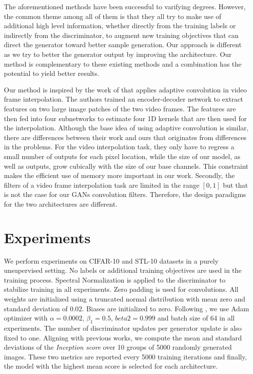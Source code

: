\documentclass{article} %
\begin{document}
The aforementioned methods have been successful to varifying degrees. However, the common theme among all of them is that they all try to make use of additional high level information, whether directly from the training labels or indirectly from the discriminator, to augment new training objectives that can direct the generator toward better sample generation. Our approach is different as we try to better the generator output by improving the architecture. Our method is complementary to these existing methods and a combination has the potential to yield better results. \par
Our method is inspired by the work of \cite{niklaus2017video} that applies adaptive convolution in video frame interpolation. The authors trained an encoder-decoder network to extract features on two large image patches of the two video frames. The features are then fed into four subnetworks to estimate four 1D kernels that are then used for the interpolation. Although the base idea of using adaptive convolution is similar, there are differences between their work and ours that originates from differences in the problems. For the video interpolation task, they only have to regress a small number of outputs for each pixel location, while the size of our model, as well as outputs, grow cubically with the size of our base channels. This constraint makes the efficient use of memory more important in our work. Secondly, the filters of a video frame interpolation task are limited in the range $[0, 1]$ but that is not the case for our GANs convolution filters. Therefore, the design paradigms for the two architectures are different.
\section{Experiments}
\label{experiments}
We perform experiments on CIFAR-10 \citep{krizhevsky2009learning} and STL-10  \citep{coates2011analysis} datasets in a purely unsupervised setting. No labels or additional training objectives are used in the training process. Spectral Normalization \citep{miyato2017spectral} is applied to the discriminator to stabilize training in all experiments. Zero padding is used for convolutions. All weights are initialized using a truncated normal distribution with mean zero and standard deviation of 0.02. Biases are initialized to zero. Following  \cite{miyato2017spectral}, we use Adam optimizer \citep{kingma2014adam} with $\alpha=0.0002$, $\beta_1=0.5$, $beta2=0.999$ and batch size of 64 in all experiments. The number of discriminator updates per generator update is also fixed to one. Aligning with previous works, we compute the mean and standard deviations of the \textit{Inception score} \citep{salimans2016improved} over 10 groups of 5000 randomly generated images. These two metrics are reported every 5000 training iterations and finally, the model with the highest mean score is selected for each architecture.
\end{document}
